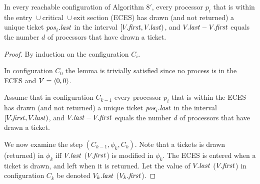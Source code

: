 \begin{lemma} \label{lemma:3.0bounded}
In every reachable configuration of Algorithm $8'$, every processor $p_i$
that is within the $\text{entry } \cup \text{critical } \cup \text{exit}$
section (ECES) has drawn (and not returned) a unique ticket $\mathit{pos}_i.\mathit{last}$ in the
interval $[V.\mathit{first}, V.\mathit{last})$, and $V.\mathit{last} - V.\mathit{first}$ equals the number
$d$ of processors that have drawn a ticket.
\end{lemma}

\begin{proof}
By induction on the configuration $C_i$.

In configuration $C_0$ the lemma is trivially satisfied since no process is in
the ECES and $V = \langle 0, 0 \rangle$.

Assume that in configuration $C_{k-1}$ every processor $p_i$
that is within the ECES has drawn (and not returned) a unique ticket $\mathit{pos}_i.\mathit{last}$ in the
interval $[V.\mathit{first}, V.\mathit{last})$, and $V.\mathit{last} - V.\mathit{first}$ equals the number
$d$ of processors that have drawn a ticket.

We now examine the step $(C_{k-1}, \phi_k, C_k)$. Note that a tickets is
drawn (returned) in $\phi_k$ iff $V.\mathit{last}$ ($V.\mathit{first}$) is modified in $\phi_k$.
The ECES is entered when a ticket is drawn, and left when it is returned.
Let the value of $V.\mathit{last}$ ($V.\mathit{first}$) in configuration $C_k$ be denoted
$V_k.\mathit{last}$ ($V_k.\mathit{first}$).


\end{proof}

